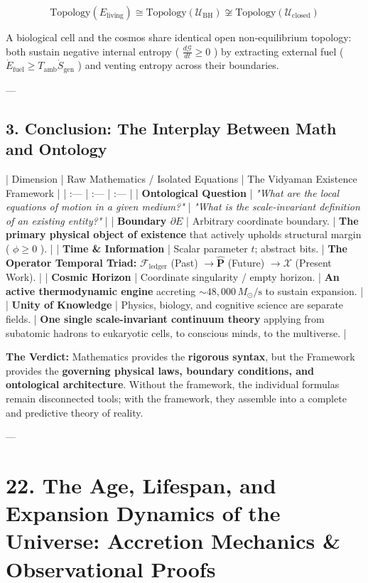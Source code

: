 \documentclass[11pt,a4paper]{article}
\theoremstyle{definition}
\theoremstyle{remark}
\begin{document}
\begin{equation}
\boxed{\text{Topology}(E_{\text{living}}) \cong \text{Topology}(\mathcal{U}_{\text{BH}}) \not\cong \text{Topology}(\mathcal{U}_{\text{closed}})}
\end{equation}


A biological cell and the cosmos share identical open non-equilibrium topology: both sustain negative internal entropy ( $\frac{d\mathcal{G}}{dt} \ge 0$ ) by extracting external fuel ( $\dot{E}_{\text{fuel}} \ge T_{\text{amb}}\dot{S}_{\text{gen}}$ ) and venting entropy across their boundaries.

---

\subsection{3. Conclusion: The Interplay Between Math and Ontology}

| Dimension | Raw Mathematics / Isolated Equations | The Vidyaman Existence Framework |
| :--- | :--- | :--- |
| \textbf{Ontological Question} | \textit{"What are the local equations of motion in a given medium?"} | \textit{"What is the scale-invariant definition of an existing entity?"} |
| \textbf{Boundary $\partial E$} | Arbitrary coordinate boundary. | \textbf{The primary physical object of existence} that actively upholds structural margin ( $\phi \ge 0$ ). |
| \textbf{Time \& Information} | Scalar parameter $t$; abstract bits. | \textbf{The Operator Temporal Triad:} $\mathcal{F}_{\text{ledger}}$ (Past) $\to \hat{\mathbf{P}}$ (Future) $\to \boldsymbol{\mathcal{X}}$ (Present Work). |
| \textbf{Cosmic Horizon} | Coordinate singularity / empty horizon. | \textbf{An active thermodynamic engine} accreting $\sim 48,000 \, M_\odot/\mathrm{s}$ to sustain expansion. |
| \textbf{Unity of Knowledge} | Physics, biology, and cognitive science are separate fields. | \textbf{One single scale-invariant continuum theory} applying from subatomic hadrons to eukaryotic cells, to conscious minds, to the multiverse. |

\textbf{The Verdict:} Mathematics provides the \textbf{rigorous syntax}, but the Framework provides the \textbf{governing physical laws, boundary conditions, and ontological architecture}. Without the framework, the individual formulas remain disconnected tools; with the framework, they assemble into a complete and predictive theory of reality.

---

\section{22. The Age, Lifespan, and Expansion Dynamics of the Universe: Accretion Mechanics \& Observational Proofs}
\end{document}
